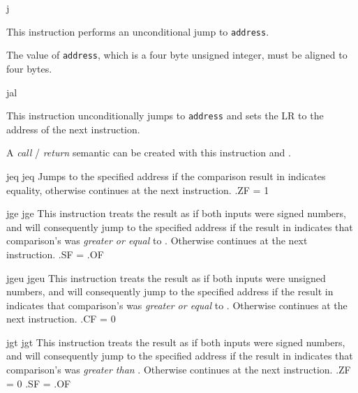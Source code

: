 \begin{instruction}{j}
     {

       This instruction performs an unconditional jump to
       \texttt{address}.

       The value of \texttt{address}, which is a four byte unsigned
       integer, must be aligned to four bytes.
     }
\end{instruction}

\begin{instruction}{jal}\label{inst:jal}
     {
       This instruction unconditionally jumps to \texttt{address} and
       sets the \ac{LR} to the address of the next instruction.

       A \emph{call} / \emph{return} semantic can be created with this
       instruction and .
     }
\end{instruction}


\begin{instruction}{jeq}
  \jumptype
     {jeq}
     {\jjeqopc}
     {
       Jumps to the specified address if the comparison result in 
       indicates equality, otherwise continues at the next
       instruction.
     }
     {
       .ZF = 1
     }
\end{instruction}


\begin{instruction}{jge}
  \jumptype
     {jge}
     {\jjgeopc}
     {This instruction treats the  result as if both
       inputs were signed numbers, and will consequently jump to the
       specified address if the result in  indicates that
       comparison's  was \emph{greater or equal} to .
       Otherwise continues at the next instruction.}
     {.SF = .OF}
\end{instruction}

\begin{instruction}{jgeu}
  \jumptype
     {jgeu}
     {\jjgeuopc}
     {This instruction treats the  result as if both
       inputs were unsigned numbers, and will consequently jump to the
       specified address if the result in  indicates that
       comparison's  was \emph{greater or equal} to .
       Otherwise continues at the next instruction.}
     {.CF = 0}
\end{instruction}

\begin{instruction}{jgt}
  \jumptype
     {jgt}
     {\jjgtopc}
     {This instruction treats the  result as if both
       inputs were signed numbers, and will consequently jump to the
       specified address if the result in  indicates that
       comparison's  was \emph{greater than} .
       Otherwise continues at the next instruction.}
     {.ZF = 0 \wedge {}.SF = .OF}
\end{instruction}

